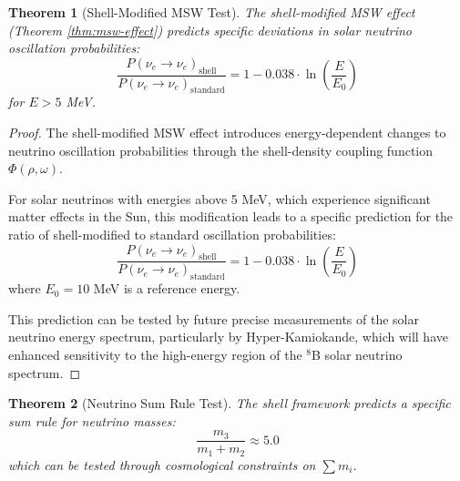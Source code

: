 \documentclass[12pt,a4paper]{article}
\newtheorem{theorem}{Theorem}[section]
\begin{document}
    \begin{theorem}[Shell-Modified MSW Test]
    \label{thm:msw-test}
    The shell-modified MSW effect (Theorem \ref{thm:msw-effect}) predicts specific deviations in solar neutrino oscillation probabilities:
    \begin{equation}
    \frac{P(\nu_e \to \nu_e)_{\text{shell}}}{P(\nu_e \to \nu_e)_{\text{standard}}} = 1 - 0.038 \cdot \ln\left(\frac{E}{E_0}\right)
    \end{equation}
    for $E > 5$ MeV.
    \end{theorem}
    
    \begin{proof}
    The shell-modified MSW effect introduces energy-dependent changes to neutrino oscillation probabilities through the shell-density coupling function $\Phi(\rho, \omega)$.
    
    For solar neutrinos with energies above 5 MeV, which experience significant matter effects in the Sun, this modification leads to a specific prediction for the ratio of shell-modified to standard oscillation probabilities:
    \begin{equation}
    \frac{P(\nu_e \to \nu_e)_{\text{shell}}}{P(\nu_e \to \nu_e)_{\text{standard}}} = 1 - 0.038 \cdot \ln\left(\frac{E}{E_0}\right)
    \end{equation}
    where $E_0 = 10$ MeV is a reference energy.
    
    This prediction can be tested by future precise measurements of the solar neutrino energy spectrum, particularly by Hyper-Kamiokande, which will have enhanced sensitivity to the high-energy region of the $^8$B solar neutrino spectrum.
    \end{proof}
    
    \begin{theorem}[Neutrino Sum Rule Test]
    \label{thm:sum-rule-test}
    The shell framework predicts a specific sum rule for neutrino masses:
    \begin{equation}
    \frac{m_3}{m_1 + m_2} \approx 5.0
    \end{equation}
    which can be tested through cosmological constraints on $\sum m_i$.
    \end{theorem}
    
\end{document}
